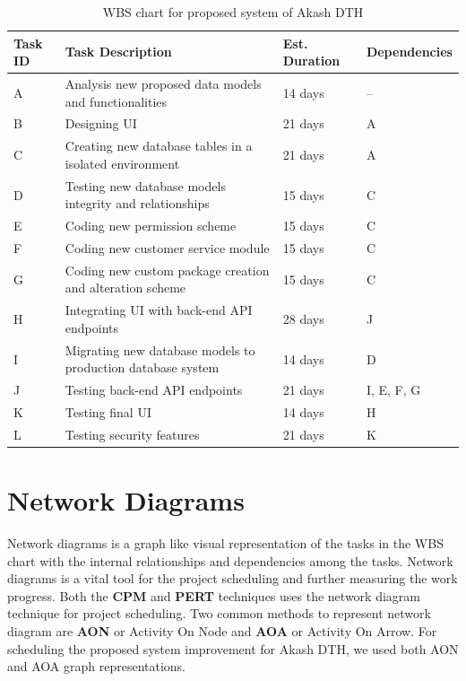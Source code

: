 \begin{spacing}{1}
\begin{table}[h!]
\begin{center}
	\begin{tabular}{| p{1cm}|p{7cm}|p{2cm}|p{3cm} |}
		\hline
		Task ID & Task Description & Est. Duration & Dependencies \\
		\hline
		A & Analysis new proposed data models and functionalities & 14 days & -- \\
		\hline
		B & Designing UI & 21 days & A \\
		\hline
		C & Creating new database tables in a isolated environment & 21 days & A \\
		\hline
		D & Testing new database models integrity and relationships & 15 days & C \\
		\hline
		E & Coding new permission scheme & 15 days & C \\
		\hline
		F & Coding new customer service module & 15 days & C \\
		\hline
		G & Coding new custom package creation and alteration scheme & 15 days & C \\
		\hline
		H & Integrating UI with back-end API endpoints & 28 days & J \\
		\hline
		I & Migrating new database models to production database system & 14 days & D \\
		\hline
		J & Testing back-end API endpoints & 21 days & I, E, F, G \\
		\hline
		K & Testing final UI & 14 days & H \\
		\hline
		L & Testing security features & 21 days & K \\
		\hline    
	\end{tabular}
\end{center}
\caption{WBS chart for proposed system of Akash DTH }
\label{chart:WBS}
\end{table}
  
\section{Network Diagrams}
Network diagrams is a graph like visual representation of the tasks in the WBS chart with the internal relationships and dependencies among the tasks. Network diagrams is a vital tool for the project scheduling and further measuring the work progress. Both the \textbf{CPM} and \textbf{PERT} techniques uses the network diagram technique for project scheduling. Two common methods to represent network diagram are \textbf{AON} or Activity On Node and \textbf{AOA} or Activity On Arrow. For scheduling the proposed system improvement for Akash DTH, we used both AON and AOA graph representations.


\end{spacing}

